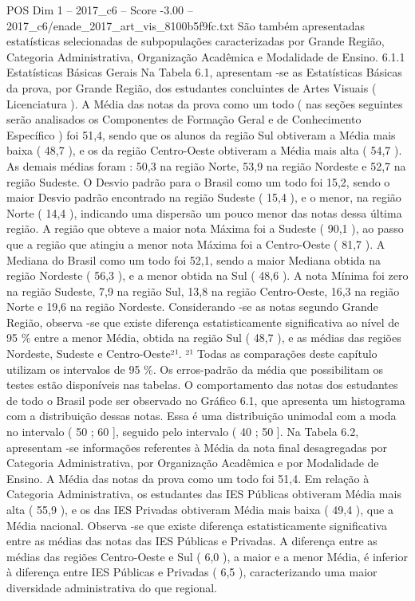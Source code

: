 \begin{textsample}{POS Dim 1 – 2017\_c6 – Score -3.00 – 2017\_c6/enade\_2017\_art\_vis\_8100b5f9fc.txt}
São também apresentadas estatísticas selecionadas de subpopulações caracterizadas por Grande Região, Categoria Administrativa, Organização Acadêmica e Modalidade de Ensino. 6.1.1 Estatísticas Básicas Gerais Na Tabela 6.1, apresentam -se as Estatísticas Básicas da prova, por Grande Região, dos estudantes concluintes de Artes Visuais ( Licenciatura ).
A Média das notas da prova como um todo ( nas seções seguintes serão analisados os Componentes de Formação Geral e de Conhecimento Específico ) foi 51,4, sendo que os alunos da região Sul obtiveram a Média mais baixa ( 48,7 ), e os da região Centro-Oeste obtiveram a Média mais alta ( 54,7 ).
As demais médias foram : 50,3 na região Norte, 53,9 na região Nordeste e 52,7 na região Sudeste.
O Desvio padrão para o Brasil como um todo foi 15,2, sendo o maior Desvio padrão encontrado na região Sudeste ( 15,4 ), e o menor, na região Norte ( 14,4 ), indicando uma dispersão um pouco menor das notas dessa última região.
A região que obteve a maior nota Máxima foi a Sudeste ( 90,1 ), ao passo que a região que atingiu a menor nota Máxima foi a Centro-Oeste ( 81,7 ).
A Mediana do Brasil como um todo foi 52,1, sendo a maior Mediana obtida na região Nordeste ( 56,3 ), e a menor obtida na Sul ( 48,6 ).
A nota Mínima foi zero na região Sudeste, 7,9 na região Sul, 13,8 na região Centro-Oeste, 16,3 na região Norte e 19,6 na região Nordeste.
Considerando -se as notas segundo Grande Região, observa -se que existe diferença estatisticamente significativa ao nível de 95 \% entre a menor Média, obtida na região Sul ( 48,7 ), e as médias das regiões Nordeste, Sudeste e Centro-Oeste²¹. ²¹ Todas as comparações deste capítulo utilizam os intervalos de 95 \%.
Os erros-padrão da média que possibilitam os testes estão disponíveis nas tabelas.
O comportamento das notas dos estudantes de todo o Brasil pode ser observado no Gráfico 6.1, que apresenta um histograma com a distribuição dessas notas.
Essa é uma distribuição unimodal com a moda no intervalo ( 50 ; 60 ], seguido pelo intervalo ( 40 ; 50 ].
Na Tabela 6.2, apresentam -se informações referentes à Média da nota final desagregadas por Categoria Administrativa, por Organização Acadêmica e por Modalidade de Ensino.
A Média das notas da prova como um todo foi 51,4.
Em relação à Categoria Administrativa, os estudantes das IES Públicas obtiveram Média mais alta ( 55,9 ), e os das IES Privadas obtiveram Média mais baixa ( 49,4 ), que a Média nacional.
Observa -se que existe diferença estatisticamente significativa entre as médias das notas das IES Públicas e Privadas.
A diferença entre as médias das regiões Centro-Oeste e Sul ( 6,0 ), a maior e a menor Média, é inferior à diferença entre IES Públicas e Privadas ( 6,5 ), caracterizando uma maior diversidade administrativa do que regional.

\end{textsample}
